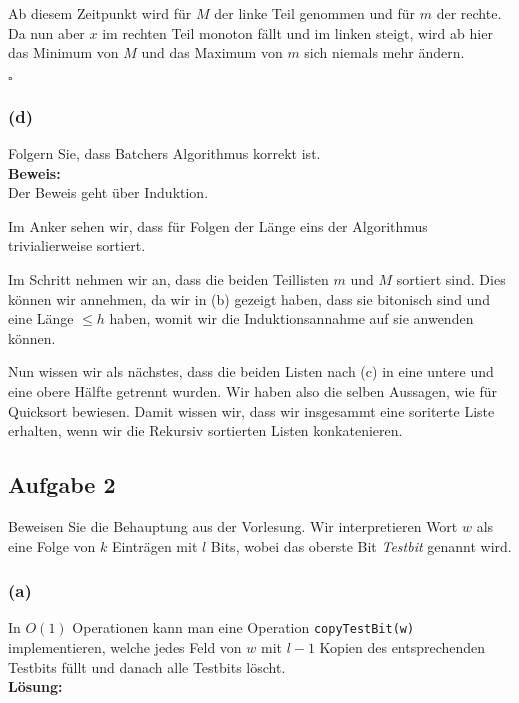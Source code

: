 \documentclass[11pt,a4paper,ngerman]{article}
\begin{document}
Ab diesem Zeitpunkt wird für $M$ der linke Teil genommen und für $m$ der rechte. Da nun aber $x$ im rechten Teil monoton fällt und im linken steigt,
wird ab hier das Minimum von $M$ und das Maximum von $m$ sich niemals mehr ändern.

\mbox{}\hfill$\square$

\subsubsection*{(d)}
Folgern Sie, dass Batchers Algorithmus korrekt ist.\\

\noindent\textbf{Beweis:}\\

Der Beweis geht über Induktion.

Im Anker sehen wir, dass für Folgen der Länge eins der Algorithmus trivialierweise sortiert.

Im Schritt nehmen wir an, dass die beiden Teillisten $m$ und $M$ sortiert sind. Dies können wir annehmen, da wir in (b) gezeigt haben, dass
sie bitonisch sind und eine Länge $\leq h$ haben, womit wir die Induktionsannahme auf sie anwenden können.

Nun wissen wir als nächstes, dass die beiden Listen nach (c) in eine untere und eine obere Hälfte getrennt wurden. Wir haben also die selben Aussagen, wie für Quicksort bewiesen. Damit wissen wir, dass wir insgesammt eine soriterte Liste erhalten, wenn wir die Rekursiv sortierten Listen konkatenieren.



\subsection*{Aufgabe 2}
Beweisen Sie die Behauptung aus der Vorlesung. Wir interpretieren Wort $w$ als eine Folge von $k$ Einträgen mit $l$ Bits, wobei das oberste Bit \emph{Testbit} genannt wird.

\subsubsection*{(a)}
In $O(1)$ Operationen kann man eine Operation \lstinline|copyTestBit(w)| implementieren, welche jedes Feld von $w$ mit $l-1$ Kopien des entsprechenden Testbits füllt und danach alle Testbits löscht.\\

\noindent\textbf{Lösung:}\\
\end{document}
